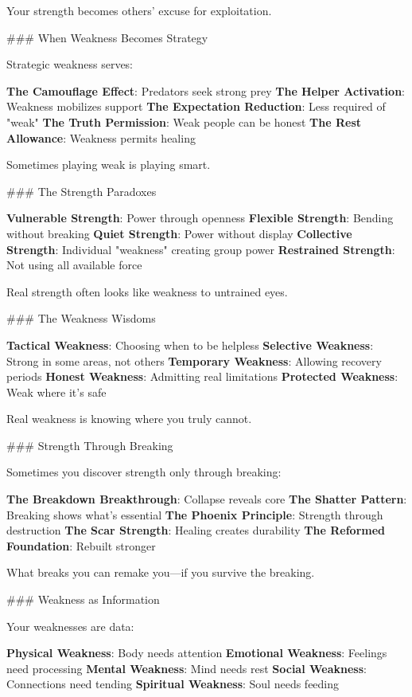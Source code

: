 \documentclass[12pt]{book}
\begin{document}
Your strength becomes others' excuse for exploitation.

\#\#\# When Weakness Becomes Strategy

Strategic weakness serves:

\textbf{The Camouflage Effect}: Predators seek strong prey
\textbf{The Helper Activation}: Weakness mobilizes support
\textbf{The Expectation Reduction}: Less required of "weak"
\textbf{The Truth Permission}: Weak people can be honest
\textbf{The Rest Allowance}: Weakness permits healing

Sometimes playing weak is playing smart.

\#\#\# The Strength Paradoxes

\textbf{Vulnerable Strength}: Power through openness
\textbf{Flexible Strength}: Bending without breaking
\textbf{Quiet Strength}: Power without display
\textbf{Collective Strength}: Individual "weakness" creating group power
\textbf{Restrained Strength}: Not using all available force

Real strength often looks like weakness to untrained eyes.

\#\#\# The Weakness Wisdoms

\textbf{Tactical Weakness}: Choosing when to be helpless
\textbf{Selective Weakness}: Strong in some areas, not others
\textbf{Temporary Weakness}: Allowing recovery periods
\textbf{Honest Weakness}: Admitting real limitations
\textbf{Protected Weakness}: Weak where it's safe

Real weakness is knowing where you truly cannot.

\#\#\# Strength Through Breaking

Sometimes you discover strength only through breaking:

\textbf{The Breakdown Breakthrough}: Collapse reveals core
\textbf{The Shatter Pattern}: Breaking shows what's essential
\textbf{The Phoenix Principle}: Strength through destruction
\textbf{The Scar Strength}: Healing creates durability
\textbf{The Reformed Foundation}: Rebuilt stronger

What breaks you can remake you—if you survive the breaking.

\#\#\# Weakness as Information

Your weaknesses are data:

\textbf{Physical Weakness}: Body needs attention
\textbf{Emotional Weakness}: Feelings need processing
\textbf{Mental Weakness}: Mind needs rest
\textbf{Social Weakness}: Connections need tending
\textbf{Spiritual Weakness}: Soul needs feeding
\end{document}
